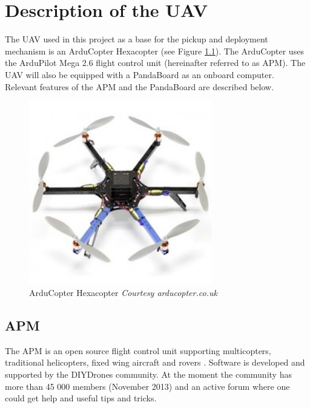 \chapter{Description of the UAV}
The UAV used in this project as a base for the pickup and deployment mechanism is an ArduCopter Hexacopter (see Figure \ref{hexaCopter}). The ArduCopter uses the ArduPilot Mega 2.6 flight control unit (hereinafter referred to as APM). The UAV will also be equipped with a PandaBoard as an onboard computer.\\
\newline
Relevant features of the APM and the PandaBoard are described below.
\begin{figure}[H]
\centering
\includegraphics[width = 8cm]{fig/hexaCopter.jpg}
\caption{ArduCopter Hexacopter \textit{Courtesy arducopter.co.uk}}
\label{hexaCopter}
\end{figure}
\section{APM}
The APM is an open source flight control unit supporting multicopters, traditional helicopters, fixed wing aircraft and rovers \citep{devArdupilot}. Software is developed and supported by the DIYDrones community. At the moment the community has more than 45 000 members (November 2013) and an active forum where one could get help and useful tips and tricks.\\
